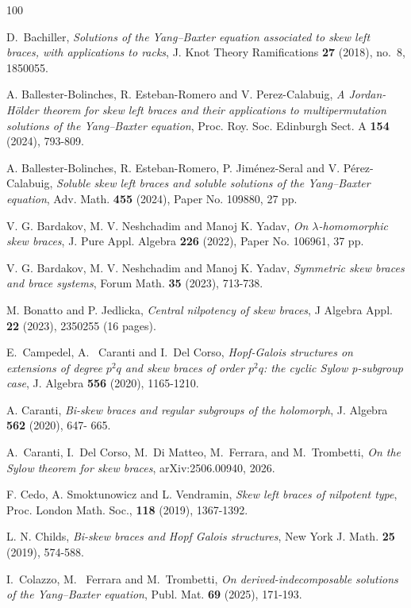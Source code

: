 \documentclass[11pt, oneside]{amsart}
\numberwithin{equation}{section}
\theoremstyle{plain}
\theoremstyle{definition}
\begin{document}
\begin{thebibliography}{100} 


 D.~Bachiller,
 \emph{Solutions of the Yang--Baxter equation associated to skew left braces,
 with applications to racks},
 J. Knot Theory Ramifications \textbf{27} (2018), no.~8, 1850055.

A. Ballester-Bolinches, R. Esteban-Romero and V. Perez-Calabuig, \emph{A Jordan-Hölder theorem for skew left braces and their applications to multipermutation solutions of the Yang--Baxter equation}, Proc. Roy. Soc. Edinburgh Sect. A {\bf 154} (2024), 793-809.

A. Ballester-Bolinches, R. Esteban-Romero, P. Jiménez-Seral and V. Pérez-Calabuig,  \emph{Soluble skew left braces and soluble solutions of the Yang--Baxter equation},  Adv. Math. {\bf 455} (2024), Paper No. 109880, 27 pp.

V. G.  Bardakov, M.  V. Neshchadim and Manoj K. Yadav,  \emph{On  $\lambda$-homomorphic skew braces}, J. Pure 	Appl. Algebra {\bf 226} (2022), Paper No. 106961, 37 pp.

V. G.  Bardakov, M.  V. Neshchadim and Manoj K. Yadav,
\emph{Symmetric skew braces and brace systems},
Forum Math. {\bf 35} (2023), 713-738.

M. Bonatto and P. Jedlicka, \emph{Central nilpotency of skew braces}, J Algebra Appl. {\bf 22} (2023), 2350255 (16 pages).

E.~Campedel, A.~ Caranti and I.~Del Corso,  \emph{Hopf-Galois structures on extensions of degree $p^2q$ and skew braces of order $p^2q$: the cyclic Sylow p-subgroup case}, J. Algebra {\bf 556} (2020), 1165-1210.

 A. Caranti, \emph{Bi-skew braces and regular subgroups of the holomorph}, J. Algebra {\bf 562} (2020), 647- 665. 

A.~Caranti, I.~Del Corso, M.~Di Matteo, M.~Ferrara, and M.~Trombetti,
\emph{On the Sylow theorem for skew braces}, arXiv:2506.00940, 2026.

F. Cedo, A.  Smoktunowicz and L.  Vendramin, {\it Skew left braces of nilpotent type}, Proc. London Math. Soc., {\bf 118} (2019), 1367-1392.

L. N. Childs,  \emph{Bi-skew braces and Hopf Galois structures}, New York J. Math. {\bf 25} (2019), 574-588.

I.~Colazzo, M.~ Ferrara and M.~Trombetti, \emph{On derived-indecomposable solutions of the Yang--Baxter equation},  Publ. Mat. {\bf 69} (2025), 171-193.


\end{thebibliography}
\end{document}
